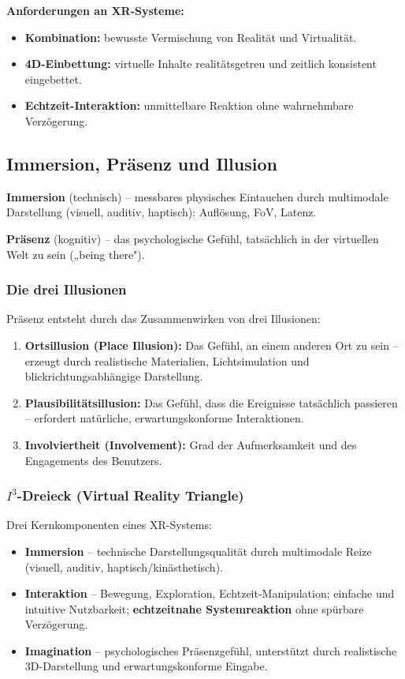 \documentclass[12pt, a4paper]{article}
\begin{document}
\textbf{Anforderungen an XR-Systeme:}
\begin{itemize}
  \item \textbf{Kombination:} bewusste Vermischung von Realität und Virtualität.
  \item \textbf{4D-Einbettung:} virtuelle Inhalte realitätsgetreu und zeitlich konsistent eingebettet.
  \item \textbf{Echtzeit-Interaktion:} unmittelbare Reaktion ohne wahrnehmbare Verzögerung.
\end{itemize}

\subsection{Immersion, Präsenz und Illusion}

\textbf{Immersion} (technisch) -- messbares physisches Eintauchen durch multimodale Darstellung (visuell, auditiv, haptisch): Auflösung, FoV, Latenz.

\textbf{Präsenz} (kognitiv) -- das psychologische Gefühl, tatsächlich in der virtuellen Welt zu sein („being there").

\subsubsection*{Die drei Illusionen}

Präsenz entsteht durch das Zusammenwirken von drei Illusionen:
\begin{enumerate}
  \item \textbf{Ortsillusion (Place Illusion):} Das Gefühl, an einem anderen Ort zu sein -- erzeugt durch realistische Materialien, Lichtsimulation und blickrichtungsabhängige Darstellung.
  \item \textbf{Plausibilitätsillusion:} Das Gefühl, dass die Ereignisse tatsächlich passieren -- erfordert natürliche, erwartungskonforme Interaktionen.
  \item \textbf{Involviertheit (Involvement):} Grad der Aufmerksamkeit und des Engagements des Benutzers.
\end{enumerate}

\subsubsection*{$I^3$-Dreieck (Virtual Reality Triangle)}

Drei Kernkomponenten eines XR-Systems:
\begin{itemize}
  \item \textbf{Immersion} -- technische Darstellungsqualität durch multimodale Reize (visuell, auditiv, haptisch/kinästhetisch).
  \item \textbf{Interaktion} -- Bewegung, Exploration, Echtzeit-Manipulation; einfache und intuitive Nutzbarkeit; \textbf{echtzeitnahe Systemreaktion} ohne spürbare Verzögerung.
  \item \textbf{Imagination} -- psychologisches Präsenzgefühl, unterstützt durch realistische 3D-Darstellung und erwartungskonforme Eingabe.
\end{itemize}
\end{document}
